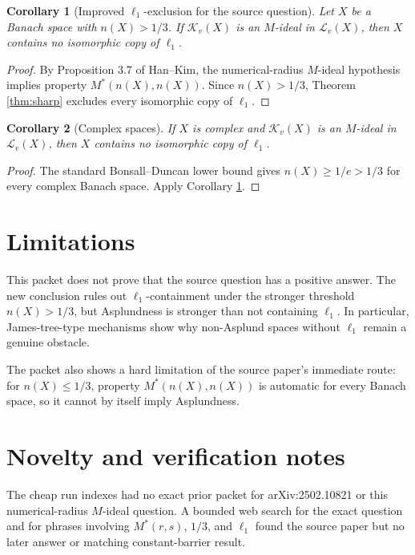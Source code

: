 \documentclass[11pt]{article}
\newtheorem{corollary}{Corollary}
\newcommand{\ellone}{\ell_1}
\begin{document}
\begin{corollary}[Improved \(\ell_1\)-exclusion for the source question]
\label{cor:source}
Let \(X\) be a Banach space with \(n(X)>1/3\).  If
\(\mathcal K_v(X)\) is an \(M\)-ideal in \(\mathcal L_v(X)\), then \(X\)
contains no isomorphic copy of \(\ellone\).
\end{corollary}

\begin{proof}
By Proposition 3.7 of Han--Kim, the numerical-radius \(M\)-ideal hypothesis
implies property \(M^*(n(X),n(X))\).  Since \(n(X)>1/3\), Theorem
\ref{thm:sharp} excludes every isomorphic copy of \(\ellone\).
\end{proof}

\begin{corollary}[Complex spaces]
If \(X\) is complex and \(\mathcal K_v(X)\) is an \(M\)-ideal in
\(\mathcal L_v(X)\), then \(X\) contains no isomorphic copy of \(\ellone\).
\end{corollary}

\begin{proof}
The standard Bonsall--Duncan lower bound gives \(n(X)\geq 1/e>1/3\) for every
complex Banach space.  Apply Corollary \ref{cor:source}.
\end{proof}

\section*{Limitations}

This packet does not prove that the source question has a positive answer.
The new conclusion rules out \(\ellone\)-containment under the stronger
threshold \(n(X)>1/3\), but Asplundness is stronger than not containing
\(\ellone\).  In particular, James-tree-type mechanisms show why
non-Asplund spaces without \(\ellone\) remain a genuine obstacle.

The packet also shows a hard limitation of the source paper's immediate route:
for \(n(X)\leq1/3\), property \(M^*(n(X),n(X))\) is automatic for every Banach
space, so it cannot by itself imply Asplundness.

\section*{Novelty and verification notes}

The cheap run indexes had no exact prior packet for arXiv:2502.10821 or this
numerical-radius \(M\)-ideal question.  A bounded web search for the exact
question and for phrases involving \(M^*(r,s)\), \(1/3\), and \(\ell_1\) found
the source paper but no later answer or matching constant-barrier result.
\end{document}
